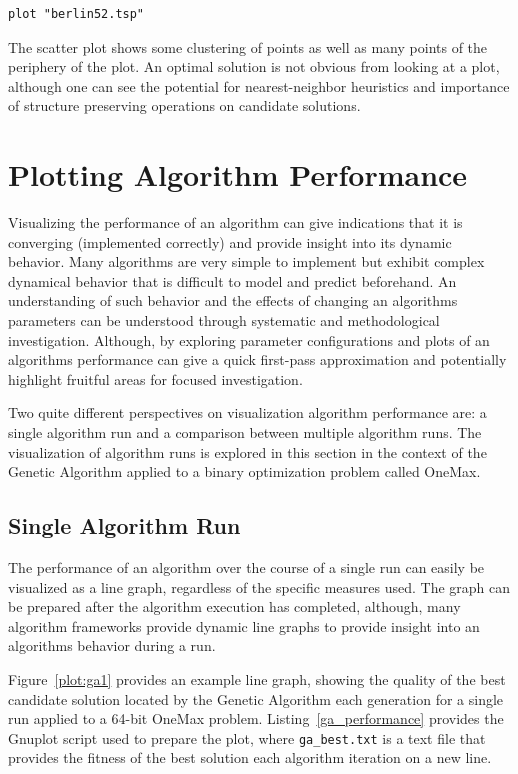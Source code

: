 \documentclass[a4paper, 11pt]{article}
\begin{document}
\begin{lstlisting}[caption=Gnuplot script for plotting the Berlin52 Traveling Salesman Problem., label=tsp1]
plot "berlin52.tsp"
\end{lstlisting}

The scatter plot shows some clustering of points as well as many points of the periphery of the plot. An optimal solution is not obvious from looking at a plot, although one can see the potential for nearest-neighbor heuristics and importance of structure preserving operations on candidate solutions.

%
%
\section{Plotting Algorithm Performance}
Visualizing the performance of an algorithm can give indications that it is converging (implemented correctly) and provide insight into its dynamic behavior. Many algorithms are very simple to implement but exhibit complex dynamical behavior that is difficult to model and predict beforehand. An understanding of such behavior and the effects of changing an algorithms parameters can be understood through systematic and methodological investigation. Although, by exploring parameter configurations and plots of an algorithms performance can give a quick first-pass approximation and potentially highlight fruitful areas for focused investigation.

Two quite different perspectives on visualization algorithm performance are: a single algorithm run and a comparison between multiple algorithm runs. The visualization of algorithm runs is explored in this section in the context of the Genetic Algorithm applied to a binary optimization problem called OneMax.

\subsection{Single Algorithm Run}
The performance of an algorithm over the course of a single run can easily be visualized as a line graph, regardless of the specific measures used. The graph can be prepared after the algorithm execution has completed, although, many algorithm frameworks provide dynamic line graphs to provide insight into an algorithms behavior during a run.

Figure~\ref{plot:ga1} provides an example line graph, showing the quality of the best candidate solution located by the Genetic Algorithm each generation for a single run applied to a 64-bit OneMax problem. Listing~\ref{ga_performance} provides the Gnuplot script used to prepare the plot, where \texttt{ga\_best.txt} is a text file that provides the fitness of the best solution each algorithm iteration on a new line.
\end{document}
